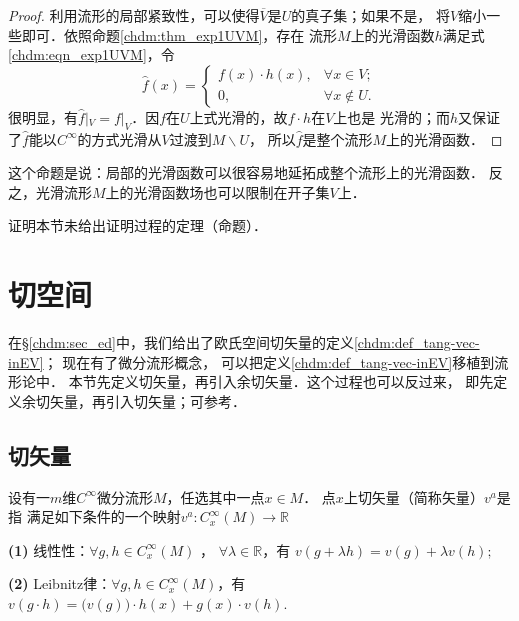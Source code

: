 \begin{proof}
    利用流形的局部紧致性，可以使得$\overline{V}$是$U$的真子集；如果不是，
    将$V$缩小一些即可．依照命题\ref{chdm:thm_exp1UVM}，存在
    流形$M$上的光滑函数$h$满足式\eqref{chdm:eqn_exp1UVM}，令
    \begin{equation}
        \hat{f}(x)=\begin{cases}
            f(x)\cdot h(x), & \forall x\in V ; \\
            0, & \forall x\notin U .
        \end{cases}
    \end{equation}
    很明显，有$\hat{f}|_V = f|_V$．因$f$在$U$上式光滑的，故$f\cdot h$在$V$上也是
    光滑的；而$h$又保证了$\hat{f}$能以$C^\infty$的方式光滑从$V$过渡到$M\backslash U$，
    所以$\hat{f}$是整个流形$M$上的光滑函数．
\end{proof}
这个命题是说：局部的光滑函数可以很容易地延拓成整个流形上的光滑函数．
反之，光滑流形$M$上的光滑函数场也可以限制在开子集$V$上．


\begin{exercise}
	证明本节未给出证明过程的定理（命题）．
\end{exercise}

\section{切空间}\label{chdm:sec_tangentspace}
在\S\ref{chdm:sec_ed}中，我们给出了欧氏空间切矢量的定义\ref{chdm:def_tang-vec-inEV}；
现在有了微分流形概念，
可以把定义\ref{chdm:def_tang-vec-inEV}移植到流形论中．
本节先定义切矢量，再引入余切矢量．这个过程也可以反过来，
即先定义余切矢量，再引入切矢量；可参考\parencite[\S 1.2]{cc2001-zh}．


\subsection{切矢量}
\begin{definition}\label{chdm:def_tang-vec-inManifold}
    设有一$m$维$C^\infty$微分流形$M$，任选其中一点$x\in M$．
    点$x$上{\heiti 切矢量}（简称{\heiti 矢量}）$v^a$是指
    满足如下条件的一个映射$v^a:C_x^\infty(M)\to \mathbb{R}$  
        
    {\bfseries (1)} 线性性：$\forall g,h \in C^\infty_x(M) $ ， $\forall \lambda \in \mathbb{R}$，有
    $v (g+\lambda h) = v (g)+ \lambda v (h) ;$
    
    {\bfseries (2)} Leibnitz律：$\forall g,h \in C^\infty_x(M) $，有
    $v (g\cdot h) = \bigl(v(g)\bigr)\cdot h(x)+ g(x)\cdot v (h) .$
\end{definition}

